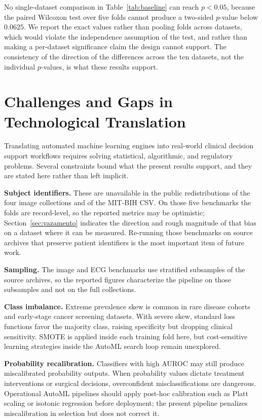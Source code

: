 \documentclass[conference]{IEEEtran}
\begin{document}
No single-dataset comparison in Table~\ref{tab:baseline} can reach $p<0.05$, because the paired Wilcoxon test over five folds cannot produce a two-sided $p$-value below $0.0625$. We report the exact values rather than pooling folds across datasets, which would violate the independence assumption of the test, and rather than making a per-dataset significance claim the design cannot support. The consistency of the direction of the differences across the ten datasets, not the individual $p$-values, is what these results support.

\section{Challenges and Gaps in Technological Translation}
\label{sec:desafios}
Translating automated machine learning engines into real-world clinical decision support workflows requires solving statistical, algorithmic, and regulatory problems. Several constraints bound what the present results support, and they are stated here rather than left implicit.

\textbf{Subject identifiers.} These are unavailable in the public redistributions of the four image collections and of the MIT-BIH CSV. On those five benchmarks the folds are record-level, so the reported metrics may be optimistic; Section~\ref{sec:vazamento} indicates the direction and rough magnitude of that bias on a dataset where it can be measured. Re-running those benchmarks on source archives that preserve patient identifiers is the most important item of future work.

\textbf{Sampling.} The image and ECG benchmarks use stratified subsamples of the source archives, so the reported figures characterize the pipeline on those subsamples and not on the full collections.

\textbf{Class imbalance.} Extreme prevalence skew is common in rare disease cohorts and early-stage cancer screening datasets. With severe skew, standard loss functions favor the majority class, raising specificity but dropping clinical sensitivity. SMOTE is applied inside each training fold here, but cost-sensitive learning strategies inside the AutoML search loop remain unexplored.

\textbf{Probability recalibration.} Classifiers with high AUROC may still produce miscalibrated probability outputs. When probability values dictate treatment interventions or surgical decisions, overconfident misclassifications are dangerous. Operational AutoML pipelines should apply post-hoc calibration such as Platt scaling or isotonic regression before deployment; the present pipeline penalizes miscalibration in selection but does not correct it.
\end{document}
